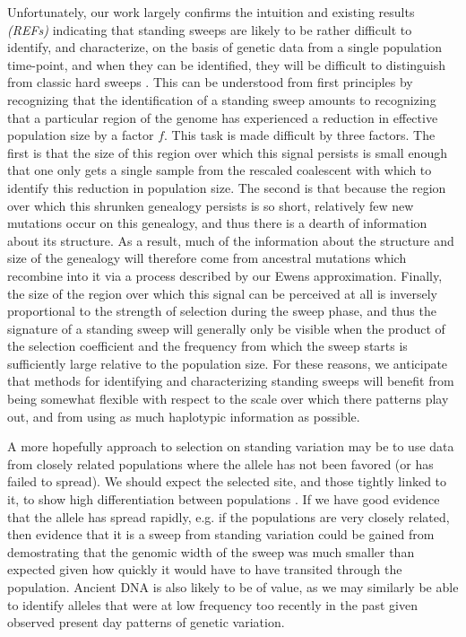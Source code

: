 \documentclass[a4paper,10pt]{article}
\newcommand{\gc}[1]{{\it \color{red} (#1)} }
\begin{document}
Unfortunately, our work largely confirms the intuition and existing results \gc{REFs} indicating that standing sweeps are likely to be rather difficult to identify, and characterize, on the basis of genetic data from a single population time-point, and when they can be identified, they will be difficult to distinguish from classic hard sweeps \citep{Peter:2012ht}. This can be understood from first principles by recognizing that the identification of a standing sweep amounts to recognizing that a particular region of the genome has experienced a reduction in effective population size by a factor $f$. This task is made difficult by three factors. The first is that the size of this region over which this signal persists is small enough that one only gets a single sample from the rescaled coalescent with which to identify this reduction in population size. The second is that because the region over which this shrunken genealogy persists is so short, relatively few new mutations occur on this genealogy, and thus there is a dearth of information about its structure. As a result, much of the information about the structure and size of the genealogy will therefore come from ancestral mutations which recombine into it via a process described by our Ewens approximation. Finally, the size of the region over which this signal can be perceived at all is inversely proportional to the strength of selection during the sweep phase, and thus the signature of a standing sweep will generally only be visible when the product of the selection coefficient and the frequency from which the sweep starts is sufficiently large relative to the population size. For these reasons, we anticipate that methods for identifying and characterizing standing sweeps will benefit from being somewhat flexible with respect to the scale over which there patterns play out, and from using as much haplotypic information as possible.

A more hopefully approach to selection on standing variation may be to use data from closely related populations where the allele has not been favored (or has failed to spread). We should expect the selected site, and those tightly linked to it, to show high differentiation between populations \citep{Innan:2008ii}. If we have good evidence that the allele has spread rapidly, e.g. if the populations are very closely related, then evidence that it is a sweep from standing variation could be gained from demostrating that the genomic width of the sweep was much smaller than expected given how quickly it would have to have transited through the population. Ancient DNA is also likely to be of value, as we may similarly be able to identify alleles that were at low frequency too recently in the past given observed present day patterns of genetic variation.
\end{document}
